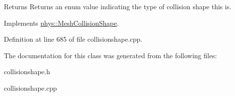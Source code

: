\begin{DoxyReturn}{Returns}
Returns an enum value indicating the type of collision shape this is. 
\end{DoxyReturn}
 

Implements \hyperlink{classphys_1_1MeshCollisionShape_abc9d3f06df71eadb59ba93eadf6ab82f}{phys::MeshCollisionShape}.



Definition at line 685 of file collisionshape.cpp.



The documentation for this class was generated from the following files:\begin{DoxyCompactItemize}
\item 
collisionshape.h\item 
collisionshape.cpp\end{DoxyCompactItemize}
